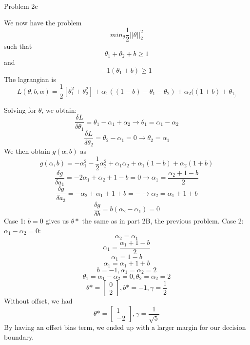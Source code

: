 \documentclass[11pt]{article}
\newcommand{\solution}[1]{{{\color{blue}{\bf Solution:} {#1}}}}
\begin{document}
\item Problem 2c

\solution{
We now have the problem \[ min_\theta \frac{1}{2} ||\theta||_2^2 \] such that \[ \theta_1 + \theta_2 + b \geq 1\] and \[ -1(\theta_1 + b) \geq 1\]
The lagrangian is \[ L(\theta, b, \alpha) = \frac{1}{2}[\theta_1^2 + \theta_2^2] + \alpha_1( (1-b) -\theta_1 -\theta_2) + \alpha_2 ( (1 + b) + \theta_1_) \]

Solving for $\theta$, we obtain: 
\[ \frac{\delta L}{\delta \theta_1} = \theta_1 - \alpha_1 + \alpha_2 \rightarrow{} \theta_1 = \alpha_ 1 - \alpha_2 \]
\[ \frac{\delta L}{\delta \theta_2} = \theta_2 - \alpha_1 = 0 \rightarrow{} \theta_2 = \alpha_1 \]
We then obtain $g(\alpha, b)$ as \[ g(\alpha, b) = -\alpha_1^2 - \frac{1}{2}\alpha_2^2 + \alpha_1 \alpha_2 + \alpha_1(1-b) + \alpha_2(1 + b) \]
\[\frac{\delta g}{\delta a_1} = -2\alpha_1 + \alpha_2 + 1 - b = 0 \rightarrow{} \alpha_1 = \frac{\alpha_2 + 1 -b}{2} \]
\[\frac{\delta g}{\delta a_2} = -\alpha_2 + \alpha_1 + 1 + b = - \rightarrow{} \alpha_2 = \alpha_1 + 1 + b \]
\[ \frac{\delta g}{\delta b} = b(\alpha_2 - \alpha_1) = 0 \]
Case 1: $b = 0$ gives us $\theta*$ the same as in part 2B, the previous problem. 
Case 2: $ \alpha_1 - \alpha_2 = 0 $: \[ \alpha_2 = \alpha_1 \] \[ \alpha_1 = \frac{\alpha_1 + 1 -b}{2} \] \[ \alpha_1 = 1 - b \] \[ \alpha_1 = \alpha_1 + 1 + b \] \[b = -1, \alpha_1 = \alpha_2 = 2 \] \[ \theta_1 = \alpha_1 - \alpha_2 = 0, \theta_2 = \alpha_2 = 2 \]
\[ \theta* = \begin{bmatrix} 0 \\ 2 \end{bmatrix}, b* = -1, \gamma = \frac{1}{2} \]
Without offset, we had \[ \theta* = \begin{bmatrix} 1 \\ -2 \end{bmatrix}, \gamma = \frac{1}{\sqrt{5}} \]
By having an offset bias term, we ended up with a larger margin for our decision boundary.
}
\newpage
\end{document}
